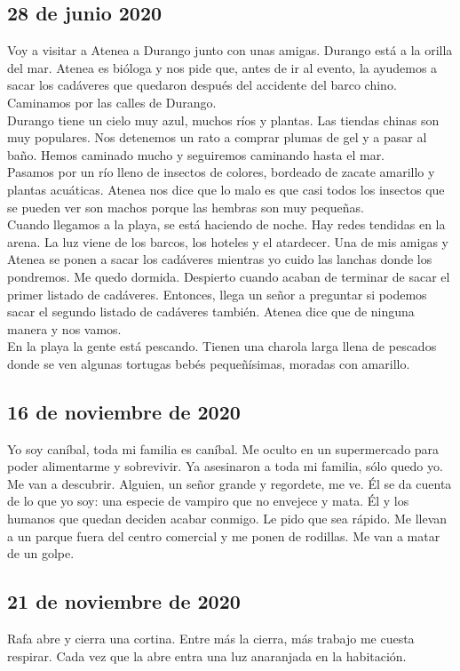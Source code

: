 \documentclass[12pt]{book}
\begin{document}
\subsection*{\hfill 28 de junio 2020}
Voy a visitar a Atenea a Durango junto con unas amigas. Durango está a la orilla del mar.
Atenea es bióloga y nos pide que, antes de ir al evento,
la ayudemos a sacar los cadáveres que quedaron después del accidente del barco chino.
Caminamos por las calles de Durango.
\\
Durango tiene un cielo muy azul, muchos ríos y plantas. Las tiendas chinas son muy populares.
Nos detenemos un rato a comprar plumas de gel y a pasar al baño.
Hemos caminado mucho y seguiremos caminando hasta el mar.
\\
Pasamos por un río lleno de insectos de colores,
 bordeado de zacate amarillo y plantas acuáticas.
 Atenea nos dice que lo malo es que casi todos los insectos
 que se pueden ver son machos porque las hembras son muy pequeñas.
 \\
Cuando llegamos a la playa, se está haciendo de noche. Hay redes tendidas en la arena. La luz viene de los barcos, los hoteles y el atardecer. Una de mis amigas y Atenea se ponen a sacar los cadáveres mientras yo cuido las lanchas donde los pondremos. Me quedo dormida. Despierto cuando acaban de terminar de sacar el primer listado de cadáveres. Entonces, llega un señor a preguntar si podemos sacar el segundo listado de cadáveres también. Atenea dice que de ninguna manera y nos vamos. \\
En la playa la gente está pescando. Tienen una charola larga llena de pescados donde se ven algunas tortugas bebés pequeñísimas, moradas con amarillo.


\subsection*{\hfill 16 de noviembre de 2020}
Yo soy caníbal, toda mi familia es caníbal. Me oculto en un supermercado para poder alimentarme y sobrevivir. Ya asesinaron a toda mi familia, sólo quedo yo. Me van a descubrir. Alguien, un señor grande y regordete, me ve. Él se da cuenta de lo que yo soy: una especie de vampiro que no envejece y mata. Él y los humanos que quedan deciden acabar conmigo. Le pido que sea rápido.
Me llevan a un parque fuera del centro comercial y me ponen de rodillas. Me van a matar de un golpe.

\subsection*{\hfill 21 de noviembre de 2020}
Rafa abre y cierra una cortina. Entre más la cierra, más trabajo me cuesta respirar. Cada vez que la abre entra una luz anaranjada en la habitación.
\end{document}
